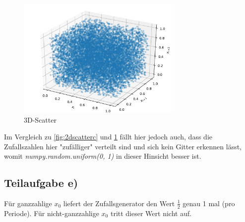 \begin{figure}[H]
  \centering
  \includegraphics[width=0.7\textwidth]{Aufgabe06/Teilaufgabe_d)_3D-Scatter.pdf}
  \caption{3D-Scatter}
  \label{fig:3dscatterc}
\end{figure}

Im Vergleich zu \ref{fig:2dscatterc} und \ref{fig:3dscatterc} fällt hier jedoch auch, dass die Zufallszahlen hier "zufälliger" verteilt sind und sich kein Gitter erkennen lässt, womit \textit{numpy.random.uniform(0, 1)} in dieser Hinsicht besser ist.

\subsection{Teilaufgabe e)}
Für ganzzahlige $x_0$ liefert der Zufallsgenerator den Wert $\frac{1}{2}$ genau 1 mal (pro Periode).
Für nicht-ganzzahlige $x_0$ tritt dieser Wert nicht auf.
